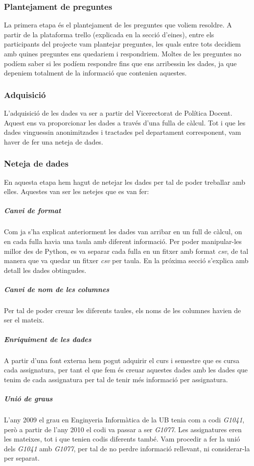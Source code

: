 \documentclass[12pt,a4paper,catalan]{article}
\begin{document}
\subsubsection{Plantejament de preguntes}
La primera etapa és el plantejament de les preguntes que voliem resoldre. A partir de la plataforma trello (explicada en la secció d'eines), entre els participants del projecte vam plantejar preguntes, les quals entre tots decidiem amb quines preguntes ens quedariem i respondriem. Moltes de les preguntes no podíem saber si les podíem respondre fins que ens arribessin les dades, ja que depeniem totalment de la informació que contenien aquestes.

\subsubsection{Adquisició}
L'adquisició de les dades va ser a partir del Vicerectorat de Política Docent. Aquest ens va proporcionar les dades a través d'una fulla de càlcul. Tot i que les dades vinguessin anonimitzades i tractades pel departament corresponent, vam haver de fer una neteja de dades.

\subsubsection{Neteja de dades}
En aquesta etapa hem hagut de netejar les dades per tal de poder treballar amb elles. Aquestes van ser les netejes que es van fer:

\subparagraph{Canvi de format}
Com ja s'ha explicat anteriorment les dades van arribar en un full de càlcul, on en cada fulla havia una taula amb diferent informació. Per poder manipular-les millor des de Python, es va separar cada fulla en un fitxer amb format \textit{csv}, de tal manera que va quedar un fitxer \textit{csv} per taula. En la próxima secció s'explica amb detall les dades obtingudes.

\subparagraph{Canvi de nom de les columnes}
Per tal de poder creuar les diferents taules, els noms de les columnes havien de ser el mateix.

\subparagraph{Enriquiment de les dades}
A partir d'una font externa hem pogut adquirir el curs i semestre que es cursa cada assignatura, per tant el que fem és creuar aquestes dades amb les dades que tenim de cada assignatura per tal de tenir més informació per assignatura.

\subparagraph{Unió de graus}
L'any 2009 el grau en Enginyeria Informàtica de la UB tenia com a codi \textit{G1041}, però a partir de l'any 2010 el codi va passar a ser \textit{G1077}. Les assignatures eren les mateixes, tot i que tenien codis diferents també. Vam procedir a fer la unió dels \textit{G1041} amb \textit{G1077}, per tal de no perdre informació rellevant, ni considerar-la per separat.
\end{document}
